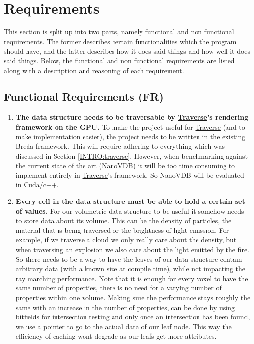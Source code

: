 \section{Requirements} \label{REQUIREMENTS}
This section is split up into two parts, namely functional and non functional requirements. The former describes certain functionalities which the program should have, and the latter describes how it does said things and how well it does said things. Below, the functional and non functional requirements are listed along with a description and reasoning of each requirement. 

\subsection{Functional Requirements (FR)}\label{REQUIREMENTS:FR}
\begin{enumerate}
    \item \textbf{The data structure needs to be traversable by \href{https://traverseresearch.nl/}{Traverse}'s rendering framework on the GPU.} To make the project useful for \href{https://traverseresearch.nl/}{Traverse} (and to make implementation easier), the project needs to be written in the existing Breda framework. This will require adhering to everything which was discussed in Section \ref{INTRO:traverse}. However, when benchmarking against the current state of the art (NanoVDB\cite{museth2021nanovdb}) it will be too time consuming to implement entirely in \href{https://traverseresearch.nl/}{Traverse}'s framework. So NanoVDB will be evaluated in Cuda/c++. \label{FR:framework}
    \item \textbf{Every cell in the data structure must be able to hold a certain set of values.} For our volumetric data structure to be useful it somehow needs to store data about its volume. This can be the density of particles, the material that is being traversed or the brightness of light emission. For example, if we traverse a cloud we only really care about the density, but when traversing an explosion we also care about the light emitted by the fire. So there needs to be a way to have the leaves of our data structure contain arbitrary data (with a known size at compile time), while not impacting the ray marching performance. Note that it is enough for every voxel to have the same number of properties, there is no need for a varying number of properties within one volume. Making sure the performance stays roughly the same with an increase in the number of properties, can be done by using bitfields for intersection testing and only once an intersection has been found, we use a pointer to go to the actual data of our leaf node. This way the efficiency of caching wont degrade as our leafs get more attributes. \label{FR:datalayout}

\end{enumerate}

